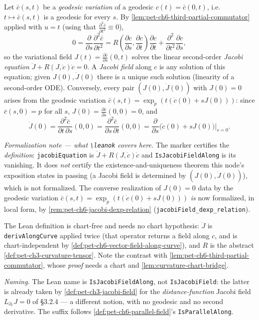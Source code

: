 \begin{definition}
  \label{def:pet-ch6-jacobi-field}


  Let $\bar c(s,t)$ be a \emph{geodesic variation} of a geodesic $c(t)=\bar
  c(0,t)$, i.e.\ $t\mapsto\bar c(s,t)$ is a geodesic for every $s$. By
  \cref{lem:pet-ch6-third-partial-commutator} applied with $u=t$ (using that
  $\frac{\partial^2\bar c}{\partial t^2}\equiv0$),
  \[
    0=\frac{\partial}{\partial s}\frac{\partial^2\bar c}{\partial t^2}
    =R\!\left(\frac{\partial c}{\partial s},\frac{\partial c}{\partial t}\right)
    \frac{\partial c}{\partial t}+\frac{\partial^2}{\partial t^2}\frac{\partial c}{\partial s},
  \]
  so the variational field $J(t)=\frac{\partial\bar c}{\partial s}(0,t)$ solves
  the linear second-order \emph{Jacobi equation} $\ddot J+R(J,\dot c)\dot c=0$.
  A \emph{Jacobi field} along $c$ is any solution of this equation; given
  $J(0),\dot J(0)$ there is a unique such solution (linearity of a second-order
  ODE). Conversely, every pair $(J(0),\dot J(0))$ with $J(0)=0$ arises from the
  geodesic variation $\bar c(s,t)=\exp_p(t(\dot c(0)+sJ(0)))$: since
  $\bar c(s,0)=p$ for all $s$, $J(0)=\frac{\partial\bar c}{\partial s}(0,0)=0$,
  and
  \[
    \dot J(0)=\frac{\partial^2\bar c}{\partial t\,\partial s}(0,0)
    =\frac{\partial^2\bar c}{\partial s\,\partial t}(0,0)
    =\frac{\partial}{\partial s}\big(\dot c(0)+sJ(0)\big)\Big|_{s=0}.
  \]

  \emph{Formalization note — what \texttt{\textbackslash leanok} covers here.} The marker
  certifies the \emph{definition}: \texttt{jacobiEquation} is $\ddot J+R(J,\dot c)\dot c$
  and \texttt{IsJacobiFieldAlong} is its vanishing. It does \emph{not} certify the
  existence-and-uniqueness theorem this node's exposition states in passing (a Jacobi field
  is determined by $(J(0),\dot J(0))$), which is not formalized. The converse realization of
  $J(0)=0$ data by the geodesic variation $\bar c(s,t)=\exp_p(t(\dot c(0)+sJ(0)))$ \emph{is}
  now formalized, in local form, by \cref{rem:pet-ch6-jacobi-dexp-relation}
  (\texttt{jacobiField\_dexp\_relation}).

  The Lean definition is chart-free and needs no chart hypothesis: $\ddot J$ is
  \texttt{derivAlongCurve} applied twice (that operator returns a field along $c$, and is
  chart-independent by \cref{def:pet-ch6-vector-field-along-curve}), and $R$ is the abstract
  \cref{def:pet-ch3-curvature-tensor}. Note the contrast with
  \cref{lem:pet-ch6-third-partial-commutator}, whose \emph{proof} needs a chart and
  \cref{lem:curvature-chart-bridge}.

  \emph{Naming.} The Lean name is \texttt{IsJacobiFieldAlong}, not
  \texttt{IsJacobiField}: the latter is already taken by \cref{def:pet-ch3-jacobi-field}
  for the \emph{distance-function} Jacobi field $L_{\partial_r}J=0$ of §3.2.4 — a different
  notion, with no geodesic and no second derivative. The suffix follows
  \cref{def:pet-ch6-parallel-field}'s \texttt{IsParallelAlong}.
\end{definition}


